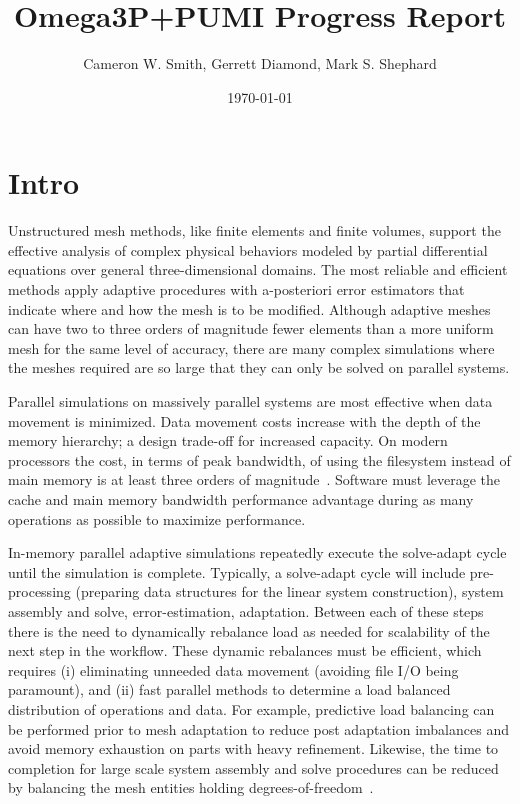 \documentclass[a4paper]{article}
\title{Omega3P+PUMI Progress Report}
\author{Cameron W. Smith, Gerrett Diamond, Mark S. Shephard}
\date{\today}
\begin{document}
\maketitle
\section{Intro}

Unstructured mesh methods, like finite elements and finite volumes, support the
effective analysis of complex physical behaviors modeled by partial differential
equations over general three-dimensional domains.
The most reliable and efficient methods apply adaptive procedures with
a-posteriori error estimators that indicate where and how the mesh is to be
modified.
Although adaptive meshes can have two to three orders of magnitude fewer
elements than a more uniform mesh for the same level of accuracy, there are many
complex simulations where the meshes required are so large that they can only be
solved on parallel systems.

Parallel simulations on massively parallel systems are most effective when data
movement is minimized.
Data movement costs increase with the depth of the memory hierarchy; a design
trade-off for increased capacity.
On modern processors the cost, in terms of peak bandwidth, of using the
filesystem instead of main memory is at least three orders of
magnitude~\cite{haring2012ibm,bui2014scalable}.
Software must leverage the cache and main memory bandwidth performance advantage
during as many operations as possible to maximize performance.

In-memory parallel adaptive simulations repeatedly execute the solve-adapt cycle
until the simulation is complete.
Typically, a solve-adapt cycle will include pre-processing (preparing data
structures for the linear system construction), system assembly and solve,
error-estimation, adaptation.
Between each of these steps there is the need to dynamically rebalance load as
needed for scalability of the next step in the workflow.
These dynamic rebalances must be efficient, which requires (i) eliminating
unneeded data movement (avoiding file I/O being paramount), and (ii) fast
parallel methods to determine a load balanced distribution of operations and
data.
For example, predictive load balancing can be performed prior to mesh adaptation
to reduce post adaptation imbalances and avoid memory exhaustion on parts with
heavy refinement.
Likewise, the time to completion for large scale system assembly and solve
procedures can be reduced by balancing the mesh entities holding
degrees-of-freedom~\cite{SmithParma2015,zhou2012unstructured}.
\end{document}
